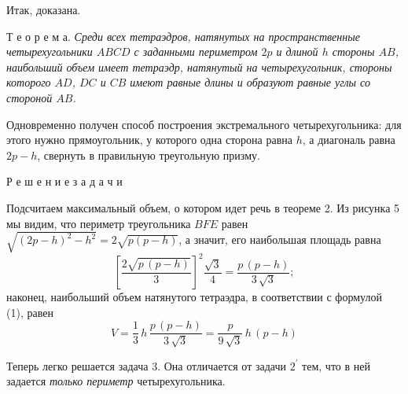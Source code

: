 \par Итак, доказана.
\par Т е о р е м а. \textit{Среди всех тетраэдров, натянутых на пространственные четырехугольники $ABCD$ с заданными периметром $2p$ и длиной $h$ стороны $AB$, наибольший объем имеет тетраэдр, натянутый на четырехугольник, стороны которого $AD$, $DC$ и $CB$ имеют равные длины и образуют равные углы со стороной $AB$.}
\par Одновременно получен способ построения экстремального четырехугольника: для этого нужно прямоугольник, у которого одна сторона равна $h$, а диагональ равна $2p - h$, свернуть в правильную треугольную призму.

\par \noindent Р е ш е н и е \quad з а д а ч и
\par Подсчитаем максимальный объем, о котором идет речь в теореме 2. Из рисунка 5 мы видим, что периметр треугольника $BFE$ равен $\sqrt{(2p-h)^{2} - h^{2}} = 2\sqrt{p(p-h)}$, а значит, его наибольшая площадь равна
\[\left[ \frac{2\sqrt{p\,(p - h)}}{3} \right]^{2}\frac{\sqrt{3}}{4} = \frac{p\,(p - h)}{3\,\sqrt{3}};\]
наконец, наибольший объем натянутого тетраэдра, в соответствии с формулой (1), равен
\begin{equation} \tag{2}
V = \frac{1}{3}\,h\,\frac{p\,(p - h)}{3\,\sqrt{3}} = \frac{p}{9\,\sqrt{3}}\,h\,(p - h)
\end{equation}

\par Теперь легко решается задача 3. Она отличается от задачи $2^\prime$ тем, что в ней задается \textit{только периметр} четырехугольника.
